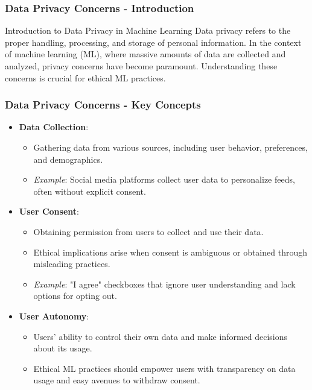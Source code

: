 \documentclass{beamer}
\begin{document}
\begin{frame}[fragile]
    \frametitle{Data Privacy Concerns - Introduction}
    \begin{block}{Introduction to Data Privacy in Machine Learning}
        Data privacy refers to the proper handling, processing, and storage of personal information. 
        In the context of machine learning (ML), where massive amounts of data are collected and 
        analyzed, privacy concerns have become paramount. Understanding these concerns is crucial for ethical ML practices.
    \end{block}
\end{frame}

\begin{frame}[fragile]
    \frametitle{Data Privacy Concerns - Key Concepts}
    \begin{itemize}
        \item \textbf{Data Collection}:
        \begin{itemize}
            \item Gathering data from various sources, including user behavior, preferences, and demographics. 
            \item \textit{Example}: Social media platforms collect user data to personalize feeds, often without explicit consent.
        \end{itemize}

        \item \textbf{User Consent}:
        \begin{itemize}
            \item Obtaining permission from users to collect and use their data. 
            \item Ethical implications arise when consent is ambiguous or obtained through misleading practices.
            \item \textit{Example}: "I agree" checkboxes that ignore user understanding and lack options for opting out.
        \end{itemize}

        \item \textbf{User Autonomy}:
        \begin{itemize}
            \item Users' ability to control their own data and make informed decisions about its usage.
            \item Ethical ML practices should empower users with transparency on data usage and easy avenues to withdraw consent.
        \end{itemize}
    \end{itemize}
\end{frame}
\end{document}
